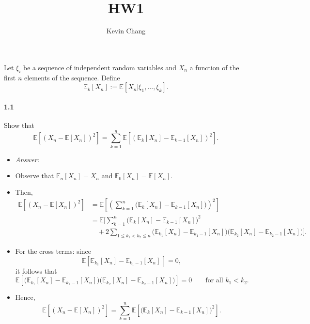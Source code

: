\documentclass[a4paper]{article}
\title{HW1}
\author{Kevin Chang}
\begin{document}
\maketitle

\section{}
Let $\xi_i$ be a sequence of independent random variables and $X_n$ a function of the first $n$ elements of the sequence.
Define
$$\mathbb{E}_k [X_n] := \mathbb{E}[X_n |\xi_1 , \dots, \xi_k ].$$

\paragraph{1.1}
Show that
$$\mathbb{E}[(X_n - \mathbb{E}[X_n])^2]= \sum_{k=1}^n \mathbb{E}[(\mathbb{E}_k [X_n ] - \mathbb{E}_{k-1} [X_n ])^2].$$

\begin{itemize}
    \item \emph{Answer:}
    \item Observe that $\mathbb{E}_n[X_n] = X_n$ and $\mathbb{E}_0[X_n] = \mathbb{E}[X_n]$.
    \item Then,
    \begin{align*}
        \mathbb{E}\!\left[(X_n - \mathbb{E}[X_n])^2\right] 
        &= \mathbb{E}\!\left[\left(\sum_{k=1}^n \big(\mathbb{E}_k[X_n] - \mathbb{E}_{k-1}[X_n]\big)\right)^2\right] \\
        &= \mathbb{E}\!\Big[\sum_{k=1}^n \big(\mathbb{E}_k[X_n] - \mathbb{E}_{k-1}[X_n]\big)^2 \\
        & \quad + 2 \sum_{1 \leq k_1 < k_2 \leq n} \big(\mathbb{E}_{k_1}[X_n] - \mathbb{E}_{k_1-1}[X_n]\big)\big(\mathbb{E}_{k_2}[X_n] - \mathbb{E}_{k_2-1}[X_n]\big)\Big].
    \end{align*}
    \item For the cross terms: since
    \[
        \mathbb{E}\!\left[\mathbb{E}_{k_1}[X_n] - \mathbb{E}_{k_1-1}[X_n] \,\right] = 0,
    \]
    it follows that
    \[
        \mathbb{E}\!\left[\big(\mathbb{E}_{k_1}[X_n] - \mathbb{E}_{k_1-1}[X_n]\big)\big(\mathbb{E}_{k_2}[X_n] - \mathbb{E}_{k_2-1}[X_n]\big)\right] = 0
        \qquad \text{for all } k_1 < k_2.
    \]
    \item Hence,
    \[
        \mathbb{E}\!\left[(X_n - \mathbb{E}[X_n])^2\right]
        = \sum_{k=1}^n \mathbb{E}\!\left[\big(\mathbb{E}_k[X_n] - \mathbb{E}_{k-1}[X_n]\big)^2\right].
    \]
\end{itemize}
\end{document}
